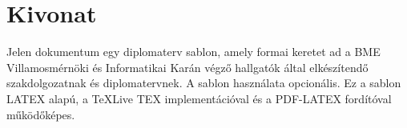 \chapter*{Kivonat}

Jelen dokumentum egy diplomaterv sablon, amely formai keretet ad a BME Villamosmérnöki és Informatikai Karán végző hallgatók által elkészítendő szakdolgozatnak és diplomatervnek. A sablon használata opcionális. Ez a sablon LATEX alapú, a TeXLive TEX 
implementációval és a PDF-LATEX fordítóval működőképes.
